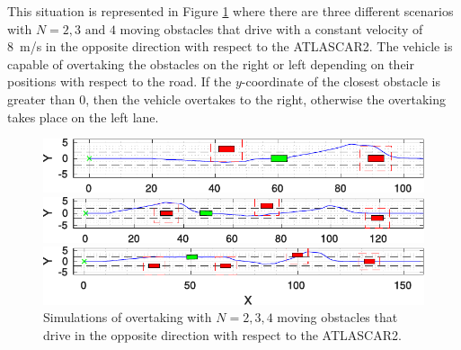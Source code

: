 This situation is represented in Figure \ref{fig:obstacleAvoidance_random}
where there are three different scenarios with $N = 2,3 \text{ and } 4$ moving obstacles that drive with a constant velocity of \SI{8}{m/s} in the opposite direction with respect to the ATLASCAR2. The vehicle is capable of overtaking the obstacles on the right or left depending on their positions with respect to the road. If the $y$-coordinate of the closest obstacle is greater than $0$, then the vehicle overtakes to the right, otherwise the overtaking takes place on the left lane.
\begin{figure}[!h]
	\centering
	\begin{minipage}[t]{\textwidth}
		\includegraphics[width=\textwidth]{./figure/random_N_obstacles/overtaking_random_2.pdf}
	\end{minipage}
	\begin{minipage}[t]{\textwidth}
		\includegraphics[width=\textwidth]{./figure/random_N_obstacles/overtaking_random.pdf}
	\end{minipage}
	\begin{minipage}[t]{\textwidth}
		\includegraphics[width=\textwidth]{./figure/random_N_obstacles/overtaking_random_1.pdf}
	\end{minipage}
	\caption{Simulations of overtaking with $N = 2,3,4$ moving obstacles that drive in the opposite direction with respect to the ATLASCAR2.}
	\label{fig:obstacleAvoidance_random}
\end{figure}

